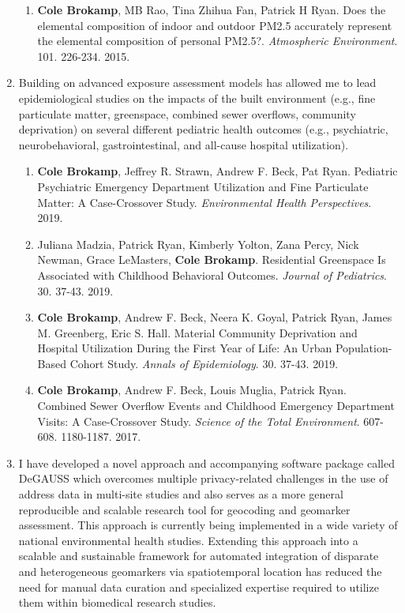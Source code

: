 \documentclass{nihbiosketch}
\begin{document}
\begin{enumerate}
\begin{enumerate}
  \item \textbf{Cole Brokamp}, MB Rao, Tina Zhihua Fan, Patrick H Ryan. Does the
    elemental composition of indoor and outdoor PM2.5 accurately represent
    the elemental composition of personal PM2.5?. \emph{Atmospheric
      Environment}. 101. 226-234. 2015.

\end{enumerate}

\item Building on advanced exposure assessment models has allowed me to lead epidemiological studies on the impacts of the built environment (e.g., fine particulate matter, greenspace, combined sewer overflows, community deprivation) on several different pediatric health outcomes (e.g., psychiatric, neurobehavioral, gastrointestinal, and all-cause hospital utilization).

  \begin{enumerate}

  \item \textbf{Cole Brokamp}, Jeffrey R. Strawn, Andrew F. Beck, Pat Ryan.
    Pediatric Psychiatric Emergency Department Utilization and Fine
    Particulate Matter: A Case-Crossover Study. \textit{Environmental Health
      Perspectives}. 2019.

  \item Juliana Madzia, Patrick Ryan, Kimberly Yolton, Zana Percy, Nick Newman, Grace
    LeMasters, \textbf{Cole Brokamp}. Residential Greenspace Is Associated with Childhood
    Behavioral Outcomes. \textit{Journal of Pediatrics}. 30. 37-43. 2019.

  \item \textbf{Cole Brokamp}, Andrew F. Beck, Neera K. Goyal, Patrick Ryan,
    James M. Greenberg, Eric S. Hall. Material Community Deprivation and
    Hospital Utilization During the First Year of Life: An Urban
    Population-Based Cohort Study. \textit{Annals of Epidemiology}. 30. 37-43.
    2019.

  \item \textbf{Cole Brokamp}, Andrew F. Beck, Louis Muglia, Patrick Ryan. Combined Sewer Overflow Events and Childhood Emergency Department Visits: A Case-Crossover Study. \textit{Science of the Total Environment}. 607-608. 1180-1187. 2017.
    
  \end{enumerate}

\item I have developed a novel approach and accompanying software package called DeGAUSS
  which overcomes multiple privacy-related challenges in the use of address data in
  multi-site studies and also serves as a more general reproducible and scalable
  research tool for geocoding and geomarker assessment. This approach is currently being
  implemented in a wide variety of national environmental health studies. Extending this
  approach into a scalable and sustainable framework for automated integration of
  disparate and heterogeneous geomarkers via spatiotemporal location has reduced
  the need for manual data curation and specialized expertise required
  to utilize them within biomedical research studies.


\end{enumerate}
\end{document}

